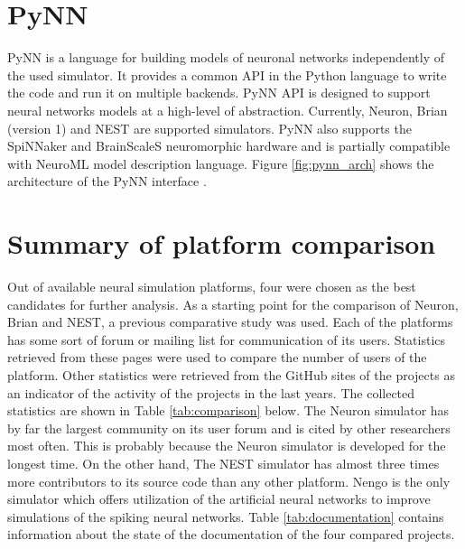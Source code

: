 \section{PyNN}
PyNN is a language for building models of neuronal networks independently of the used simulator. It provides a common API in the Python language to write the code and run it on multiple backends. PyNN API is designed to support neural networks models at a high-level of abstraction. Currently, Neuron, Brian (version 1) and NEST are supported simulators. PyNN also supports the SpiNNaker and BrainScaleS neuromorphic hardware and is partially compatible with NeuroML model description language. Figure \ref{fig:pynn_arch} shows the architecture of the PyNN interface \cite{bruderleNeuroscientificModelingMixedSignal2009}.


\section{Summary of platform comparison}
Out of available neural simulation platforms, four were chosen as the best candidates for further analysis. As a starting point for the comparison of Neuron, Brian and NEST, a previous comparative study \cite{tikidji-hamburyanSoftwareBrainNetwork2017} was used. Each of the platforms has some sort of forum or mailing list for communication of its users. Statistics retrieved from these pages were used to compare the number of users of the platform. Other statistics were retrieved from the GitHub sites of the projects as an indicator of the activity of the projects in the last years. The collected statistics are shown in Table \ref{tab:comparison} below. The Neuron simulator has by far the largest community on its user forum and is cited by other researchers most often. This is probably because the Neuron simulator is developed for the longest time. On the other hand, The NEST simulator has almost three times more contributors to its source code than any other platform. Nengo is the only simulator which offers utilization of the artificial neural networks to improve simulations of the spiking neural networks. Table \ref{tab:documentation} contains information about the state of the documentation of the four compared projects.
